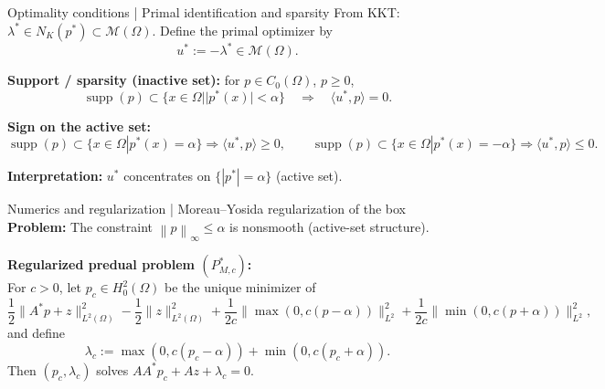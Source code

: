 \documentclass[aspectratio=169]{beamer}
\newcommand{\M}{\mathcal{M}}
\newcommand{\norm}[1]{\left\lVert #1\right\rVert}
\newcommand{\supp}{\operatorname{supp}}
\begin{document}
\begin{frame}{Optimality conditions | Primal identification and sparsity }
\small
From KKT: $\lambda^\ast\in N_K(p^\ast)\subset \M(\Omega)$.
Define the primal optimizer by
\[
u^\ast := -\lambda^\ast \in \M(\Omega).
\]

\medskip
\textbf{Support / sparsity (inactive set):}
for $p\in C_0(\Omega)$, $p\ge0$,
\[
\supp(p)\subset\{x \in \Omega | |p^\ast(x)|<\alpha\}
\quad\Longrightarrow\quad
\langle u^\ast,p\rangle=0.
\]

\medskip
\textbf{Sign on the active set:}
\[
\supp(p)\subset\{x \in \Omega | p^\ast(x)=\alpha\}\Rightarrow \langle u^\ast,p\rangle\ge0,
\qquad
\supp(p)\subset\{x \in \Omega | p^\ast(x)=-\alpha\}\Rightarrow \langle u^\ast,p\rangle\le0.
\]

\medskip
\textbf{Interpretation:}
$u^\ast$ concentrates on $\{|p^\ast|=\alpha\}$ (active set).
\end{frame}


\begin{frame}{Numerics and regularization | Moreau--Yosida regularization of the box}
\textbf{Problem:}
The constraint $\norm{p}_\infty\le \alpha$ is nonsmooth (active-set structure). \newline

\textbf{Regularized predual problem $(P^\ast_{M,c})$:} \\
For $c>0$, let $p_c\in H_0^2(\Omega)$ be the unique minimizer of
\[
\frac12\|A^\ast p+z\|_{L^2(\Omega)}^2-\frac12\|z\|_{L^2(\Omega)}^2
+\frac{1}{2c}\|\max(0,c(p-\alpha))\|_{L^2}^2
+\frac{1}{2c}\|\min(0,c(p+\alpha))\|_{L^2}^2,
\]
and define
\[
\lambda_c:=\max(0,c(p_c-\alpha))+\min(0,c(p_c+\alpha)).
\]
Then $(p_c,\lambda_c)$ solves $AA^\ast p_c+Az+\lambda_c=0$.


\end{frame}
\end{document}

